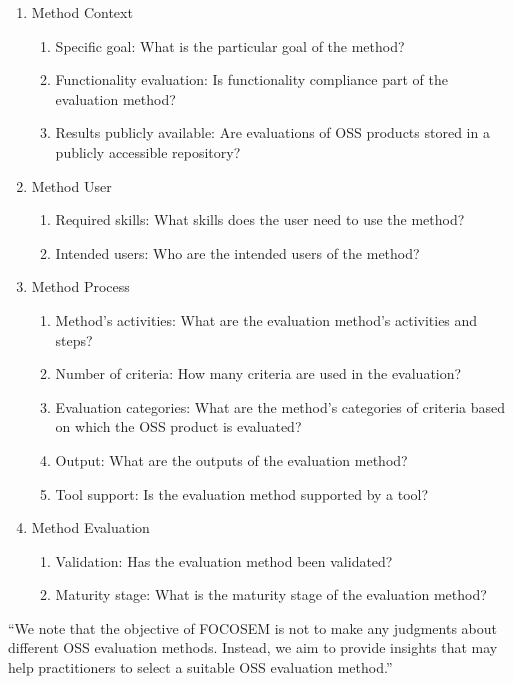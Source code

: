 \documentclass[DIV=calc,paper=a4,fontsize=9pt,twocolumn]{scrartcl}
\begin{document}
\begin{enumerate}
    \item Method Context
    \begin{enumerate}
        \item Specific goal: What is the particular goal of the method?
        \item Functionality evaluation: Is functionality compliance part of the evaluation method?
        \item Results publicly available: Are evaluations of OSS products stored in a publicly accessible repository?
    \end{enumerate}
    \item Method User
    \begin{enumerate}
        \item Required skills: What skills does the user need to use the method?
        \item Intended users: Who are the intended users of the method?
    \end{enumerate}
    \item Method Process
    \begin{enumerate}
        \item Method's activities: What are the evaluation method's activities and steps? 
        \item Number of criteria: How many criteria are used in the evaluation?
        \item Evaluation categories: What are the method's categories of criteria based on which the OSS product is evaluated?
        \item Output: What are the outputs of the evaluation method?
        \item Tool support: Is the evaluation method supported by a tool?
    \end{enumerate}
    \item Method Evaluation
    \begin{enumerate}
        \item Validation: Has the evaluation method been validated?
        \item Maturity stage: What is the maturity stage of the evaluation method?
    \end{enumerate}
\end{enumerate}

\enquote{We note that the objective of FOCOSEM is not to make any judgments about different OSS evaluation methods. Instead, we aim to provide insights that may help practitioners to select a suitable OSS evaluation method.} \citep{stol2010comparison}
\end{document}
